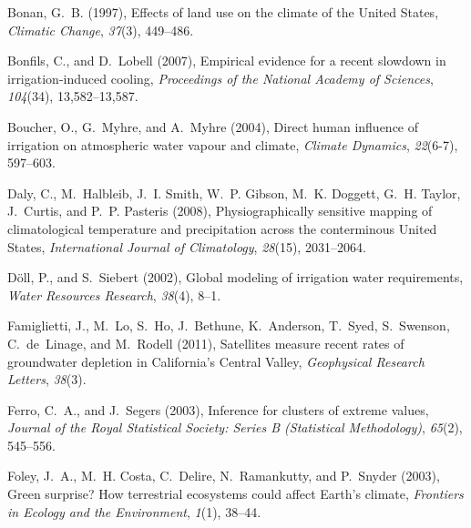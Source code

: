 \documentclass[draft,ms]{agutex}   %
\begin{document}
\begin{article}
\begin{thebibliography}{43}
Bonan, G.~B. (1997), {Effects of land use on the climate of the United States},
  \textit{Climatic Change}, \textit{37}(3), 449--486.

Bonfils, C., and D.~Lobell (2007), Empirical evidence for a recent slowdown in
  irrigation-induced cooling, \textit{Proceedings of the National Academy of
  Sciences}, \textit{104}(34), 13,582--13,587.

Boucher, O., G.~Myhre, and A.~Myhre (2004), Direct human influence of
  irrigation on atmospheric water vapour and climate, \textit{Climate
  Dynamics}, \textit{22}(6-7), 597--603.

Daly, C., M.~Halbleib, J.~I. Smith, W.~P. Gibson, M.~K. Doggett, G.~H. Taylor,
  J.~Curtis, and P.~P. Pasteris (2008), {Physiographically sensitive mapping of
  climatological temperature and precipitation across the conterminous United
  States}, \textit{International Journal of Climatology}, \textit{28}(15),
  2031--2064.

D{\"o}ll, P., and S.~Siebert (2002), Global modeling of irrigation water
  requirements, \textit{Water Resources Research}, \textit{38}(4), 8--1.

Famiglietti, J., M.~Lo, S.~Ho, J.~Bethune, K.~Anderson, T.~Syed, S.~Swenson,
  C.~de~Linage, and M.~Rodell (2011), {Satellites measure recent rates of
  groundwater depletion in California's Central Valley}, \textit{Geophysical
  Research Letters}, \textit{38}(3).

Ferro, C.~A., and J.~Segers (2003), Inference for clusters of extreme values,
  \textit{Journal of the Royal Statistical Society: Series B (Statistical
  Methodology)}, \textit{65}(2), 545--556.

Foley, J.~A., M.~H. Costa, C.~Delire, N.~Ramankutty, and P.~Snyder (2003),
  {Green surprise? How terrestrial ecosystems could affect Earth's climate},
  \textit{Frontiers in Ecology and the Environment}, \textit{1}(1), 38--44.


\end{thebibliography}
\end{article}
\end{document}
